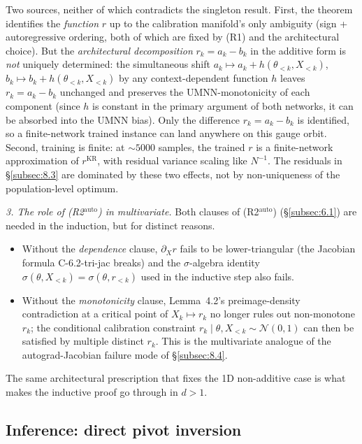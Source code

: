 \documentclass[11pt]{article}
\providecommand{\tightlist}{\setlength{\itemsep}{0pt}\setlength{\parskip}{0pt}}
\begin{document}
Two sources, neither of which contradicts the singleton result. First,
the theorem identifies the \emph{function} \(r\) up to the calibration
manifold's only ambiguity (sign + autoregressive ordering, both of
which are fixed by (R1) and the architectural choice). But the
\emph{architectural decomposition} \(r_k = a_k - b_k\) in the additive
form is \emph{not} uniquely determined: the simultaneous shift
\(a_k \mapsto a_k + h(\theta_{<k}, X_{<k})\),
\(b_k \mapsto b_k + h(\theta_{<k}, X_{<k})\) by any context-dependent
function \(h\) leaves \(r_k = a_k - b_k\) unchanged and preserves the
UMNN-monotonicity of each component (since \(h\) is constant in the
primary argument of both networks, it can be absorbed into the UMNN
bias). Only the difference \(r_k = a_k - b_k\) is identified, so a
finite-network trained instance can land anywhere on this gauge orbit.
Second, training is finite: at \(\sim 5000\) samples, the trained \(r\)
is a finite-network approximation of \(r^{\mathrm{KR}}\), with residual
variance scaling like \(N^{-1}\). The residuals in \S\ref{subsec:8.3}
are dominated by these two effects, not by non-uniqueness of the
population-level optimum.

\emph{3. The role of (R2\(^\mathrm{auto}\)) in multivariate.} Both
clauses of (R2\(^\mathrm{auto}\)) (\S\ref{subsec:6.1}) are needed in the
induction, but for distinct reasons.
\begin{itemize}
\tightlist
\item Without the \emph{dependence} clause, \(\partial_X r\) fails to be
  lower-triangular (the Jacobian formula C-6.2-tri-jac breaks) and the
  \(\sigma\)-algebra identity \(\sigma(\theta, X_{<k}) = \sigma(\theta, r_{<k})\)
  used in the inductive step also fails.
\item Without the \emph{monotonicity} clause, Lemma~4.2's preimage-density
  contradiction at a critical point of \(X_k \mapsto r_k\) no longer
  rules out non-monotone \(r_k\); the conditional calibration constraint
  \(r_k \mid \theta, X_{<k} \sim \mathcal{N}(0,1)\) can then be satisfied
  by multiple distinct \(r_k\). This is the multivariate analogue of the
  autograd-Jacobian failure mode of \S\ref{subsec:8.4}.
\end{itemize}
The same architectural prescription that fixes the 1D non-additive case
is what makes the inductive proof go through in \(d > 1\).

\subsection{Inference: direct pivot inversion}\label{subsec:6.4}
\end{document}
